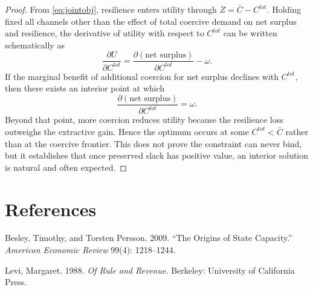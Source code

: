 \documentclass[12pt]{article}
\begin{document}
\begin{proof}
From \eqref{eq:jointobj}, resilience enters utility through $Z = \bar C - C^{tot}$. Holding fixed all channels other than the effect of total coercive demand on net surplus and resilience, the derivative of utility with respect to $C^{tot}$ can be written schematically as
\begin{equation}
\frac{\partial U}{\partial C^{tot}} = \frac{\partial (\text{net surplus})}{\partial C^{tot}} - \omega.
\end{equation}
If the marginal benefit of additional coercion for net surplus declines with $C^{tot}$, then there exists an interior point at which
\begin{equation}
\frac{\partial (\text{net surplus})}{\partial C^{tot}} = \omega.
\end{equation}
Beyond that point, more coercion reduces utility because the resilience loss outweighs the extractive gain. Hence the optimum occurs at some $C^{tot} < \bar C$ rather than at the coercive frontier. This does not prove the constraint can never bind, but it establishes that once preserved slack has positive value, an interior solution is natural and often expected.\qedhere
\end{proof}

\section*{References}

Besley, Timothy, and Torsten Persson. 2009. ``The Origins of State Capacity.'' \emph{American Economic Review} 99(4): 1218--1244.

Levi, Margaret. 1988. \emph{Of Rule and Revenue}. Berkeley: University of California Press.
\end{document}
